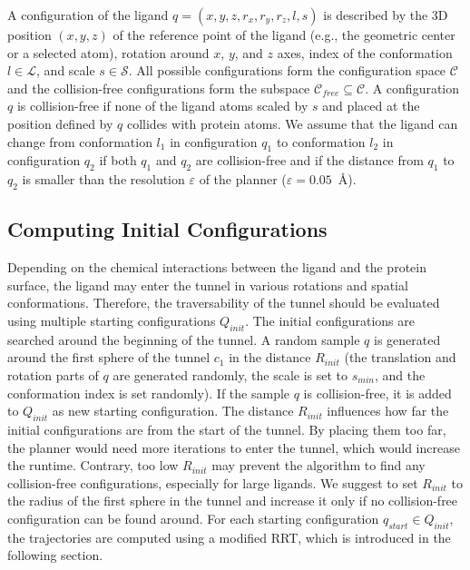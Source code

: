 \documentclass[usletter, 10pt, conference]{ieeeconf} %
\def\qstart{q_{start}}
\def\qinit{\qstart}
\def\qgoal{q_{goal}}
\def\C{\mathcal{C}}
\def\CF{\mathcal{C}_{free}}
\def\QI{Q_{init}}
\def\RI{R_{init}}
\def\smin{s_{min}}
\def\L{\mathcal{L}}
\def\S{\mathcal{S}}
\begin{document}
A configuration of the ligand $q=(x,y,z,r_x,r_y,r_z,l,s)$ is described
by the 3D position $(x,y,z)$ of the reference point of the ligand (e.g., the geometric center or a selected atom), rotation around $x$, $y$, and $z$ axes,
index of the conformation $l\in \L$, and scale $s \in \S$.
All possible configurations form the configuration space $\C$ and the collision-free configurations
form the subspace $\CF \subseteq \C$.
A configuration $q$ is collision-free if none of the ligand atoms scaled by $s$ and placed at the
position defined by $q$ collides with protein atoms.
We assume that the ligand can change from conformation $l_1$ in configuration $q_1$ to conformation $l_2$ in configuration $q_2$
if both $q_1$ and $q_2$ are collision-free and if the distance from $q_1$ to $q_2$ is smaller than the resolution $\varepsilon$ of the planner ($\varepsilon=0.05$~\AA).


\subsection{Computing Initial Configurations}

Depending on the chemical interactions between the ligand and the protein surface, the ligand may enter the tunnel in various rotations and spatial conformations.
Therefore, the traversability of the tunnel should be evaluated using multiple starting configurations $\QI$.
The initial configurations are searched around the beginning of the tunnel.
A random sample $q$ is generated around the first sphere of the tunnel 
$c_1$ in the distance $\RI$ (the translation and rotation parts of $q$ are generated randomly, the scale is set to $\smin$, and the conformation index is set randomly).
If the sample $q$ is collision-free, it is added to $\QI$ as new starting configuration.
The distance $\RI$ influences how far the initial configurations are from the start of the tunnel.
By placing them too far, the planner would need more iterations to enter the tunnel, which would increase the runtime.
Contrary, too low $\RI$ may prevent the algorithm to find any collision-free configurations, especially for large ligands.
We suggest to set $\RI$ to the radius of the first sphere in the tunnel and increase it only if no collision-free configuration
can be found around.
For each starting configuration $\qinit \in \QI$, the trajectories are computed using a modified RRT, which is introduced in the following section.
\end{document}
